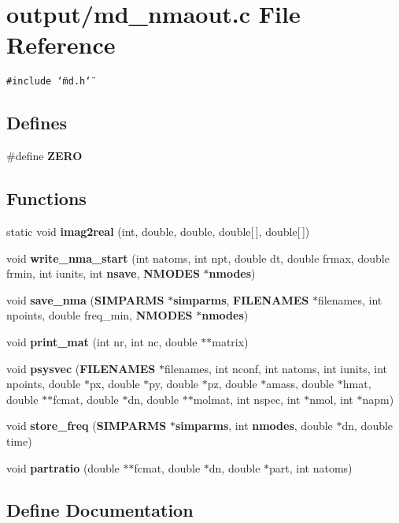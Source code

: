 \section{output/md\_\-nmaout.c File Reference}
\label{md__nmaout_8c}
{\tt \#include \char`\"{}md.h\char`\"{}}\par
\subsection*{Defines}
\begin{CompactItemize}
\item 
\#define {\bf ZERO}
\end{CompactItemize}
\subsection*{Functions}
\begin{CompactItemize}
\item 
static void {\bf imag2real} (int, double, double, double[$\,$], double[$\,$])
\item 
void {\bf write\_\-nma\_\-start} (int natoms, int npt, double dt, double frmax, double frmin, int iunits, int {\bf nsave}, {\bf NMODES} $\ast${\bf nmodes})
\item 
void {\bf save\_\-nma} ({\bf SIMPARMS} $\ast${\bf simparms}, {\bf FILENAMES} $\ast$filenames, int npoints, double freq\_\-min, {\bf NMODES} $\ast${\bf nmodes})
\item 
void {\bf print\_\-mat} (int nr, int nc, double $\ast$$\ast$matrix)
\item 
void {\bf psysvec} ({\bf FILENAMES} $\ast$filenames, int nconf, int natoms, int iunits, int npoints, double $\ast$px, double $\ast$py, double $\ast$pz, double $\ast$amass, double $\ast$hmat, double $\ast$$\ast$fcmat, double $\ast$dn, double $\ast$$\ast$molmat, int nspec, int $\ast$nmol, int $\ast$napm)
\item 
void {\bf store\_\-freq} ({\bf SIMPARMS} $\ast${\bf simparms}, int {\bf nmodes}, double $\ast$dn, double time)
\item 
void {\bf partratio} (double $\ast$$\ast$fcmat, double $\ast$dn, double $\ast$part, int natoms)
\end{CompactItemize}


\subsection{Define Documentation}
